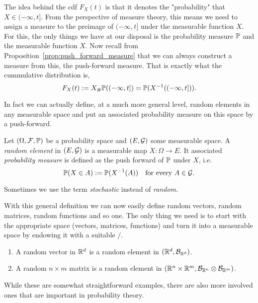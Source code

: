 The idea behind the cdf $F_X(t)$ is that it denotes the "probability" that $X \in (-\infty ,t]$. From the perspective of measure theory, this means we need to assign a measure to the preimage of $(-\infty, t]$ under the measurable function $X$. For this, the only things we have at our disposal is the probability measure $\mathbb P$ and the measurable function $X$. Now recall from Proposition~\ref{prop:push_forward_measure} that we can always construct a measure from this, the push-forward measure. That is exactly what the cummulative distribution is,
\[
	F_X(t) := X_\# \mathbb P((-\infty, t]) = \mathbb P(X^{-1}((-\infty,t])).
\]

In fact we can actually define, at a much more general level, random elements in any measurable space and put an associated probability measure on this space by a push-forward.

\begin{definition}
Let $(\Omega,\mathcal F, \mathbb P)$ be a probability space and $(E,\mathcal G)$ some measurable space. A \emph{random element} in $(E,\mathcal G)$ is a measurable map $X : \Omega \to E$. It associated \emph{probability measure} is defined as the push forward of $\mathbb P$ under $X$, i.e.
\[
	\mathbb P(X \in A) := \mathbb P(X^{-1}(A)) \quad \text{for every } A \in \mathcal G.
\]
\end{definition}

Sometimes we use the term \emph{stochastic} instead of \emph{random}. 

With this general definition we can now easily define random vectors, random matrices, random functions and so one. The only thing we need is to start with the appropriate space (vectors, matrices, functions) and turn it into a measurable space by endowing it with a suitable \sigalg/. 

\begin{example}
\hfill
\begin{enumerate}
\item A random vector in $\mathbb R^d$ is a random element in $(\mathbb R^d, \mathcal B_{\mathbb R^d})$.
\item A random $n \times m$ matrix is a random element in $(\mathbb R^n \times \mathbb R^m, \mathcal B_{\mathbb R^n} \otimes \mathcal B_{\mathbb R^m})$.
\end{enumerate}
\end{example}

While these are somewhat straightforward examples, there are also more involved ones that are important in probability theory.

